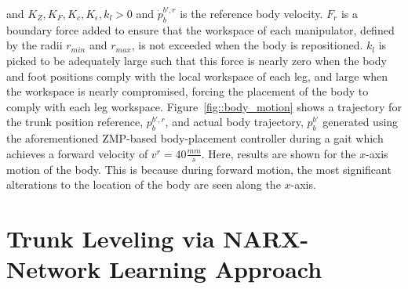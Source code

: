 		and $K_{Z}, K_{F}, K_{c}, K_{\epsilon}, k_{l} > 0$ and $\dot{p}_{b}^{b',r}$ is the reference body velocity. $F_{r}$ is a boundary force added to ensure that the workspace of each manipulator, defined by the radii $r_{min}$ and $r_{max}$, is not exceeded when the body is repositioned. $k_{l}$ is picked to be adequately large such that this force is nearly zero when the body and foot positions comply with the local workspace of each leg, and large when the workspace is nearly compromised, forcing the placement of the body to comply with each leg workspace. Figure~\ref{fig::body_motion} shows a trajectory for the trunk position reference, ${p}_{b}^{b',r}$, and actual body trajectory, ${p}_{b}^{b'}$ generated using the aforementioned ZMP-based body-placement controller during a gait which achieves a forward velocity of $v^{r}=40\frac{mm}{s}$. Here, results are shown for the $x$-axis motion of the body. This is because during forward motion, the most significant alterations to the location of the body are seen along the $x$-axis.



	\section{Trunk Leveling via NARX-Network Learning Approach}
		\label{sec::trunk_leveling_NARX}
		
